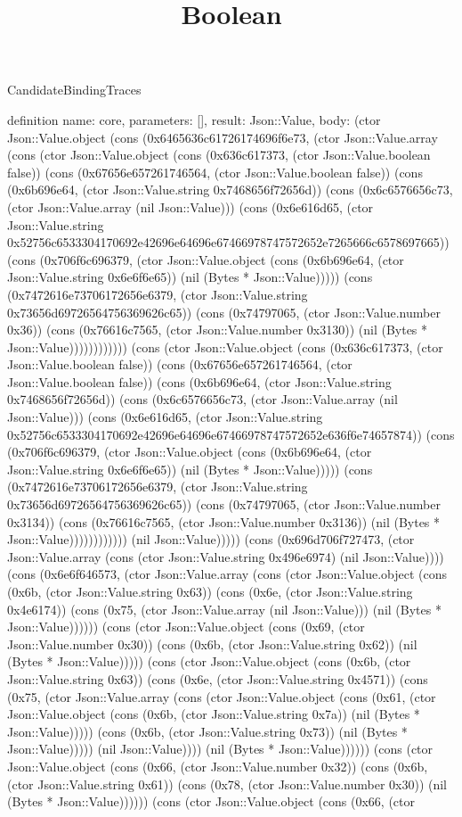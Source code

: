 \begin{lexlean}{CandidateBindingTraces}
\title{Boolean}
\begin{semanticmodule}

definition{
 name: core,
 parameters: [],
 result: Json::Value,
 body: (ctor Json::Value.object (cons (0x6465636c61726174696f6e73, (ctor Json::Value.array (cons (ctor Json::Value.object (cons (0x636c617373, (ctor Json::Value.boolean false)) (cons (0x67656e657261746564, (ctor Json::Value.boolean false)) (cons (0x6b696e64, (ctor Json::Value.string 0x7468656f72656d)) (cons (0x6c6576656c73, (ctor Json::Value.array (nil Json::Value))) (cons (0x6e616d65, (ctor Json::Value.string 0x52756c6533304170692e42696e64696e67466978747572652e7265666c6578697665)) (cons (0x706f6c696379, (ctor Json::Value.object (cons (0x6b696e64, (ctor Json::Value.string 0x6e6f6e65)) (nil (Bytes * Json::Value))))) (cons (0x7472616e73706172656e6379, (ctor Json::Value.string 0x73656d69726564756369626c65)) (cons (0x74797065, (ctor Json::Value.number 0x36)) (cons (0x76616c7565, (ctor Json::Value.number 0x3130)) (nil (Bytes * Json::Value)))))))))))) (cons (ctor Json::Value.object (cons (0x636c617373, (ctor Json::Value.boolean false)) (cons (0x67656e657261746564, (ctor Json::Value.boolean false)) (cons (0x6b696e64, (ctor Json::Value.string 0x7468656f72656d)) (cons (0x6c6576656c73, (ctor Json::Value.array (nil Json::Value))) (cons (0x6e616d65, (ctor Json::Value.string 0x52756c6533304170692e42696e64696e67466978747572652e636f6e74657874)) (cons (0x706f6c696379, (ctor Json::Value.object (cons (0x6b696e64, (ctor Json::Value.string 0x6e6f6e65)) (nil (Bytes * Json::Value))))) (cons (0x7472616e73706172656e6379, (ctor Json::Value.string 0x73656d69726564756369626c65)) (cons (0x74797065, (ctor Json::Value.number 0x3134)) (cons (0x76616c7565, (ctor Json::Value.number 0x3136)) (nil (Bytes * Json::Value)))))))))))) (nil Json::Value))))) (cons (0x696d706f727473, (ctor Json::Value.array (cons (ctor Json::Value.string 0x496e6974) (nil Json::Value)))) (cons (0x6e6f646573, (ctor Json::Value.array (cons (ctor Json::Value.object (cons (0x6b, (ctor Json::Value.string 0x63)) (cons (0x6e, (ctor Json::Value.string 0x4e6174)) (cons (0x75, (ctor Json::Value.array (nil Json::Value))) (nil (Bytes * Json::Value)))))) (cons (ctor Json::Value.object (cons (0x69, (ctor Json::Value.number 0x30)) (cons (0x6b, (ctor Json::Value.string 0x62)) (nil (Bytes * Json::Value))))) (cons (ctor Json::Value.object (cons (0x6b, (ctor Json::Value.string 0x63)) (cons (0x6e, (ctor Json::Value.string 0x4571)) (cons (0x75, (ctor Json::Value.array (cons (ctor Json::Value.object (cons (0x61, (ctor Json::Value.object (cons (0x6b, (ctor Json::Value.string 0x7a)) (nil (Bytes * Json::Value))))) (cons (0x6b, (ctor Json::Value.string 0x73)) (nil (Bytes * Json::Value))))) (nil Json::Value)))) (nil (Bytes * Json::Value)))))) (cons (ctor Json::Value.object (cons (0x66, (ctor Json::Value.number 0x32)) (cons (0x6b, (ctor Json::Value.string 0x61)) (cons (0x78, (ctor Json::Value.number 0x30)) (nil (Bytes * Json::Value)))))) (cons (ctor Json::Value.object (cons (0x66, (ctor }
\end{semanticmodule}
\end{lexlean}
